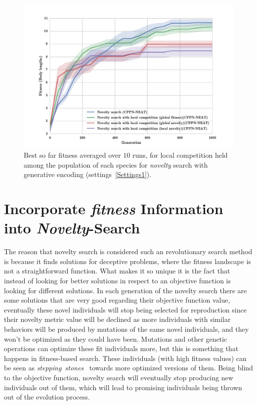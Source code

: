 \begin{figure}[t!]
\centering
\includegraphics[width=1.0\textwidth]{../Figures/Results/NoveltyCompetitionsSize5.pdf}
\caption{Best so far fitness averaged over $10$ runs, for local competition held among the population of each species for \emph{novelty} search with generative encoding (settings~\ref{Settings1}).}
\label{fig:NoveltyCompetitionsSize5}
\end{figure}



\section{Incorporate \emph{fitness} Information into \emph{Novelty}-Search}

The reason that novelty search is considered such an revolutionary search method is because it finds solutions for deceptive problems, where the fitness landscape is not a straightforward function. What makes it so unique it is the fact that instead of looking for better solutions in respect to an objective function is looking for different solutions. In each generation of the novelty search there are some solutions that are very good regarding their objective function value, eventually these novel individuals will stop being selected for reproduction since their novelty metric value will be declined as more individuals with similar behaviors will be produced by mutations of the same novel individuals, and they won't be optimized as they could have been. Mutations and other genetic operations can optimize these fit individuals more, but this is something that happens in fitness-based search. These individuals (with high fitness values) can be seen as \emph{stepping~stones}~\cite{lehman2011abandoning} towards more optimized versions of them. Being blind to the objective function, novelty search will eventually stop producing new individuals out of them, which will lead to promising individuals being thrown out of the evolution process. 

